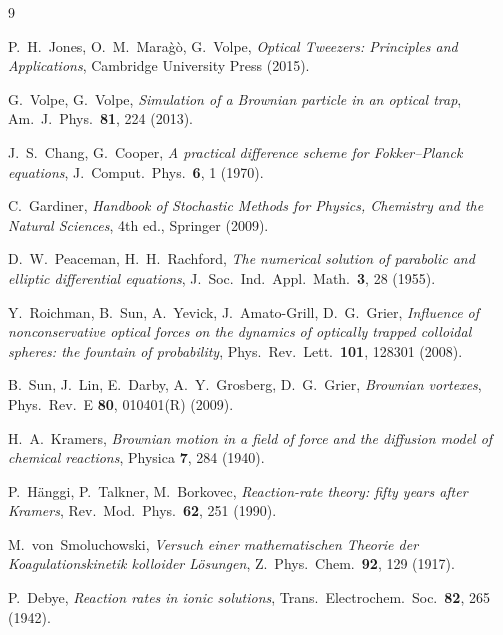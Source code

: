 \documentclass[11pt]{article}
\begin{document}
\begin{thebibliography}{9}

P.~H.~Jones, O.~M.~Mara\`{g}\`{o}, G.~Volpe,
\emph{Optical Tweezers: Principles and Applications},
Cambridge University Press (2015).

G.~Volpe, G.~Volpe,
\emph{Simulation of a Brownian particle in an optical trap},
Am.\ J.\ Phys.\ \textbf{81}, 224 (2013).

J.~S.~Chang, G.~Cooper,
\emph{A practical difference scheme for Fokker--Planck equations},
J.\ Comput.\ Phys.\ \textbf{6}, 1 (1970).

C.~Gardiner,
\emph{Handbook of Stochastic Methods for Physics, Chemistry and the Natural Sciences},
4th ed., Springer (2009).

D.~W.~Peaceman, H.~H.~Rachford,
\emph{The numerical solution of parabolic and elliptic differential equations},
J.\ Soc.\ Ind.\ Appl.\ Math.\ \textbf{3}, 28 (1955).

Y.~Roichman, B.~Sun, A.~Yevick, J.~Amato-Grill, D.~G.~Grier,
\emph{Influence of nonconservative optical forces on the dynamics of optically trapped colloidal spheres: the fountain of probability},
Phys.\ Rev.\ Lett.\ \textbf{101}, 128301 (2008).

B.~Sun, J.~Lin, E.~Darby, A.~Y.~Grosberg, D.~G.~Grier,
\emph{Brownian vortexes},
Phys.\ Rev.\ E \textbf{80}, 010401(R) (2009).

H.~A.~Kramers,
\emph{Brownian motion in a field of force and the diffusion model of chemical reactions},
Physica \textbf{7}, 284 (1940).

P.~H\"anggi, P.~Talkner, M.~Borkovec,
\emph{Reaction-rate theory: fifty years after Kramers},
Rev.\ Mod.\ Phys.\ \textbf{62}, 251 (1990).

M.~von~Smoluchowski,
\emph{Versuch einer mathematischen Theorie der Koagulationskinetik kolloider L\"osungen},
Z.\ Phys.\ Chem.\ \textbf{92}, 129 (1917).

P.~Debye,
\emph{Reaction rates in ionic solutions},
Trans.\ Electrochem.\ Soc.\ \textbf{82}, 265 (1942).

\end{thebibliography}

\appendix
\end{document}
